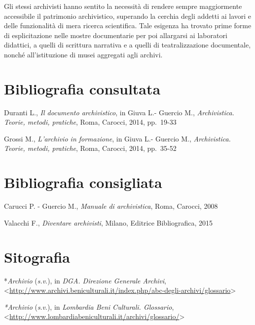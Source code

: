 \documentclass[
  b5paper,
  twoside,
  11pt,
  chapterprefix=false,
  bibliography=totocnumbered,
  listof=flat]{scrbook}
\begin{document}
Gli stessi archivisti hanno sentito la necessità di rendere sempre
maggiormente accessibile il patrimonio archivistico, superando la
cerchia degli addetti ai lavori e delle funzionalità di mera ricerca
scientifica. Tale esigenza ha trovato prime forme di esplicitazione
nelle mostre documentarie per poi allargarsi ai laboratori didattici, a
quelli di scrittura narrativa e a quelli di teatralizzazione
documentale, nonché all'istituzione di musei aggregati agli archivi.

\hypertarget{bibliografia-consultata}{%
\section*{Bibliografia consultata}\label{bibliografia-consultata}}

Duranti L., \emph{Il documento archivistico}, in Giuva L.- Guercio M.,
\emph{Archivistica. Teorie, metodi, pratiche}, Roma, Carocci, 2014, pp.~19-33

Grossi M., \emph{L'archivio in formazione}, in Giuva L.- Guercio M.,
\emph{Archivistica. Teorie, metodi, pratiche}, Roma, Carocci, 2014, pp.~35-52

\hypertarget{bibliografia-consigliata}{%
\section*{Bibliografia consigliata}\label{bibliografia-consigliata}}

Carucci P. - Guercio M., \emph{Manuale di archivistica}, Roma, Carocci, 2008

Valacchi F., \emph{Diventare archivisti}, Milano, Editrice Bibliografica,
2015

\hypertarget{sitografia}{%
\section*{Sitografia}\label{sitografia}}

*\emph{Archivio} (\emph{s.v}.), in \emph{DGA. Direzione Generale Archivi},
\textless{}{\url{http://www.archivi.beniculturali.it/index.php/abc-degli-archivi/glossario}\textgreater{}}

\emph{*Archivio} (\emph{s}.\emph{v}.), in \emph{Lombardia Beni Culturali. Glossario},
\textless{}{\url{http://www.lombardiabeniculturali.it/archivi/glossario/}\textgreater{}}
\end{document}
